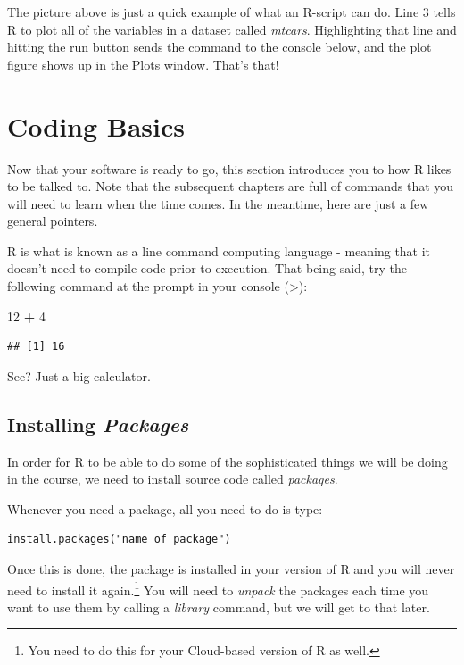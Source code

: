 \documentclass[
]{book}
\newenvironment{Shaded}{\begin{snugshade}}{\end{snugshade}}
\newcommand{\DecValTok}[1]{\textcolor[rgb]{0.00,0.00,0.81}{#1}}
\newcommand{\SpecialCharTok}[1]{\textcolor[rgb]{0.81,0.36,0.00}{\textbf{#1}}}
\begin{document}
The picture above is just a quick example of what an R-script can do. Line 3 tells R to plot all of the variables in a dataset called \emph{mtcars}. Highlighting that line and hitting the run button sends the command to the console below, and the plot figure shows up in the Plots window. That's that!

\section{Coding Basics}\label{coding-basics}

Now that your software is ready to go, this section introduces you to how R likes to be talked to. Note that the subsequent chapters are full of commands that you will need to learn when the time comes. In the meantime, here are just a few general pointers.

R is what is known as a line command computing language - meaning that it doesn't need to compile code prior to execution. That being said, try the following command at the prompt in your console (\textgreater):

\begin{Shaded}
\begin{Highlighting}[]
\DecValTok{12} \SpecialCharTok{+} \DecValTok{4}
\end{Highlighting}
\end{Shaded}

\begin{verbatim}
## [1] 16
\end{verbatim}

See? Just a big calculator.

\subsection{\texorpdfstring{Installing \emph{Packages}}{Installing Packages}}\label{installing-packages}

In order for R to be able to do some of the sophisticated things we will be doing in the course, we need to install source code called \emph{packages}.

Whenever you need a package, all you need to do is type:

\begin{verbatim}
install.packages("name of package")
\end{verbatim}

Once this is done, the package is installed in your version of R and you will never need to install it again.\footnote{You need to do this for your Cloud-based version of R as well.} You will need to \emph{unpack} the packages each time you want to use them by calling a \emph{library} command, but we will get to that later.
\end{document}
